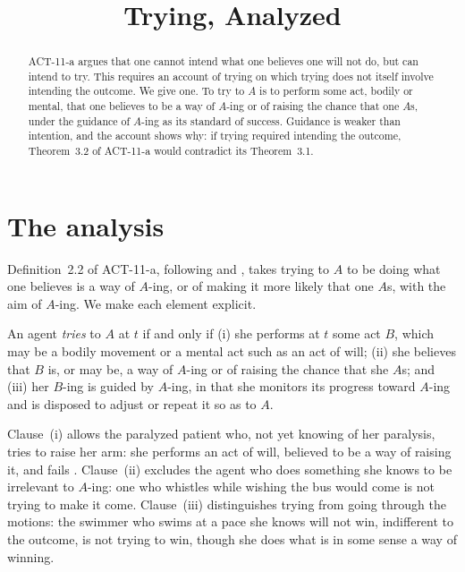 \documentclass{situationist-preprint}
\title{Trying, Analyzed}
\begin{document}
\maketitle

\begin{abstract}
ACT-11-a argues that one cannot intend what one believes one will not do, but can intend to try. This requires an account of trying on which trying does not itself involve intending the outcome. We give one. To try to $A$ is to perform some act, bodily or mental, that one believes to be a way of $A$-ing or of raising the chance that one $A$s, under the guidance of $A$-ing as its standard of success. Guidance is weaker than intention, and the account shows why: if trying required intending the outcome, Theorem~3.2 of ACT-11-a would contradict its Theorem~3.1.
\end{abstract}

\section{The analysis}

Definition~2.2 of ACT-11-a, following \citet{OShaughnessy1973} and \citet{Hornsby1980}, takes trying to $A$ to be doing what one believes is a way of $A$-ing, or of making it more likely that one $A$s, with the aim of $A$-ing. We make each element explicit.

\begin{definition}\label{d:try}
An agent \emph{tries} to $A$ at $t$ if and only if (i) she performs at $t$ some act $B$, which may be a bodily movement or a mental act such as an act of will; (ii) she believes that $B$ is, or may be, a way of $A$-ing or of raising the chance that she $A$s; and (iii) her $B$-ing is guided by $A$-ing, in that she monitors its progress toward $A$-ing and is disposed to adjust or repeat it so as to $A$.
\end{definition}

Clause~(i) allows the paralyzed patient who, not yet knowing of her paralysis, tries to raise her arm: she performs an act of will, believed to be a way of raising it, and fails \citep{OShaughnessy1973}. Clause~(ii) excludes the agent who does something she knows to be irrelevant to $A$-ing: one who whistles while wishing the bus would come is not trying to make it come. Clause~(iii) distinguishes trying from going through the motions: the swimmer who swims at a pace she knows will not win, indifferent to the outcome, is not trying to win, though she does what is in some sense a way of winning.
\end{document}
